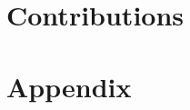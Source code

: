 \documentclass[a4paper, twocolumn]{article}
\begin{document}
    \section*{Contributions}

    \nocite{*} %
    
    
    \onecolumn \appendix
    \section*{Appendix}

    
    
\end{document}

